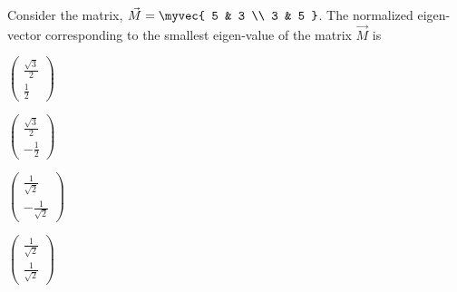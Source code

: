     \item Consider the matrix, $\vec{M} = \myvec{ 5 & 3 \\ 3 & 5 }$. The normalized eigen-vector corresponding to the smallest eigen-value of the matrix $\vec{M}$ is  
    \hfill{}
    \begin{enumerate} \begin{multicols}{4}              
        \item $\begin{pmatrix} \frac{\sqrt{3}}{2} \\ \frac{1}{2} \end{pmatrix}$  
        \item $\begin{pmatrix} \frac{\sqrt{3}}{2} \\ -\frac{1}{2} \end{pmatrix}$  
        \item $\begin{pmatrix} \frac{1}{\sqrt{2}} \\ -\frac{1}{\sqrt{2}} \end{pmatrix}$  
        \item $\begin{pmatrix} \frac{1}{\sqrt{2}} \\ \frac{1}{\sqrt{2}} \end{pmatrix}$
    \end{multicols} \end{enumerate}              
    
    
